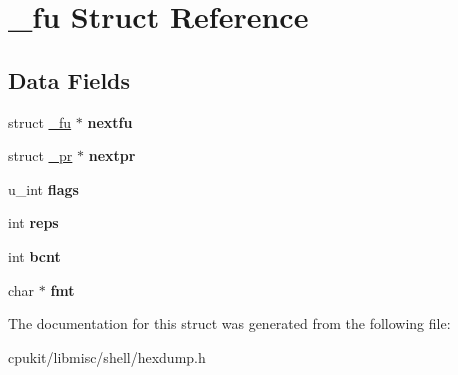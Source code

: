 \hypertarget{struct__fu}{}\section{\+\_\+fu Struct Reference}
\label{struct__fu}
\subsection*{Data Fields}
\begin{DoxyCompactItemize}
\item 
\mbox{\label{struct__fu_aa487403537885527b6868cb4cfd3f584}} 
struct \mbox{\hyperlink{struct__fu}{\+\_\+fu}} $\ast$ {\bfseries nextfu}
\item 
\mbox{\label{struct__fu_a7a40e24064029d046d52b426b5a6de79}} 
struct \mbox{\hyperlink{struct__pr}{\+\_\+pr}} $\ast$ {\bfseries nextpr}
\item 
\mbox{\label{struct__fu_ab40d1b32caa05ea0d2fcc52cc1f998d8}} 
u\+\_\+int {\bfseries flags}
\item 
\mbox{\label{struct__fu_adcf65d54ca473603bb372ec4396938b5}} 
int {\bfseries reps}
\item 
\mbox{\label{struct__fu_a5cba0fa744f132e7f04abf4c04658f02}} 
int {\bfseries bcnt}
\item 
\mbox{\label{struct__fu_a4e451635ae6d73ae844dd2e1a14d2745}} 
char $\ast$ {\bfseries fmt}
\end{DoxyCompactItemize}


The documentation for this struct was generated from the following file\+:\begin{DoxyCompactItemize}
\item 
cpukit/libmisc/shell/hexdump.\+h\end{DoxyCompactItemize}
